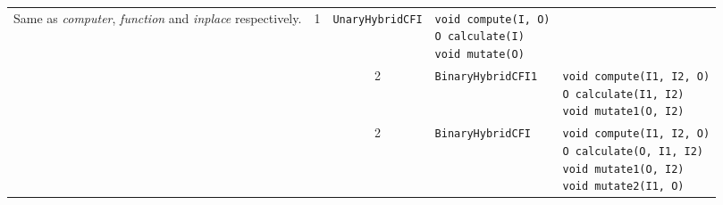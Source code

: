 \documentclass{bmcart}
\begin{document}
\begin{backmatter}
\begin{table}[h!]
\begin{tabular}{| l | l | c | l | p{1.4in} |}
{                                   Same as \textit{computer}, \textit{function} and \textit{inplace} respectively.
                                   }                     & 1              & \texttt{UnaryHybridCFI}    & \parbox[t]{2in}{
                                                                                                         \texttt{void compute(I, O)}\\
                                                                                                         \texttt{O calculate(I)}\\
                                                                                                         \texttt{void mutate(O)}
                                                                                                         }                                   \\[0.25in] 
                                 &                       & 2              & \texttt{BinaryHybridCFI1}  & \parbox[t]{2in}{
                                                                                                         \texttt{void compute(I1, I2, O)}\\
                                                                                                         \texttt{O calculate(I1, I2)}\\
                                                                                                         \texttt{void mutate1(O, I2)}
                                                                                                         }                                   \\[0.25in] 
                                 &                       & 2              & \texttt{BinaryHybridCFI}   & \parbox[t]{2in}{
                                                                                                         \texttt{void compute(I1, I2, O)}\\
                                                                                                         \texttt{O calculate(O, I1, I2)}\\
                                                                                                         \texttt{void mutate1(O, I2)}\\
                                                                                                         \texttt{void mutate2(I1, O)}
                                                                                                         }                                   \\[0.4in] \hline
    \end{tabular}
  \end{table}


\end{backmatter}
\end{document}

